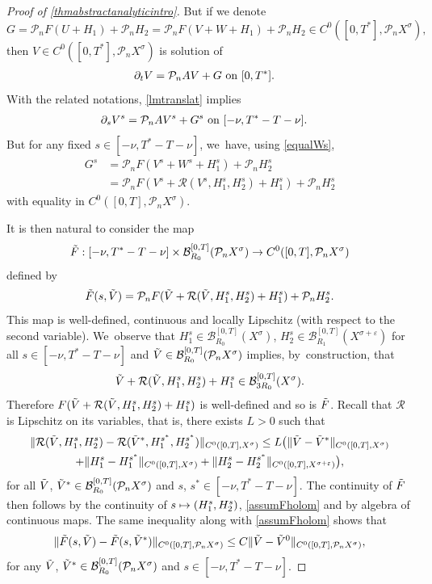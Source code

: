 \documentclass[10pt]{amsart}
\newcommand\mto{\mathchoice{\longmapsto}{\mapsto}{\mapsto}{\mapsto}}
\theoremstyle{definition}
\let\mc\mathcal
\let\veps\varepsilon
\newcommand{\B}{\mc{B}}
\renewcommand{\P}{\mathcal{P}}
\providecommand{\norm}[1]{\lVert#1\rVert}
\begin{document}
\begin{proof}[Proof of \cref{thmabstractanalyticintro}]
But if we denote
\[
G=\P_n F(U+H_{1})+\P_n H_{2}=\P_n F(V+W+H_{1})+\P_n H_{2}\in C^0([0,T^*],\P_n X^{\sigma}),
\]
then $V\in C^0([0,T^*],\P_n X^{\sigma})$ is solution of
\begin{align*}
\partial_t V=\P_n AV+G& \textnormal{ on } [0,T^{*}].
\end{align*}
With the related notations, \cref{lmtranslat} implies
\begin{align}
\label{eqVG}
\partial_s V^s=\P_n AV^s+G^s& \textnormal{ on } [-\nu, T^*-T-\nu].
\end{align}
But for any fixed $s\in [-\nu, T^*-T-\nu]$, we~have, using \eqref{equalWs},
\begin{align*}
G^s&=\P_n F(V^s+W^s+H_{1}^s)+\P_n H_{2}^s\\ &=\P_n F(V^s+\mathcal{R}(V^s,H_{1}^s,H_{2}^s)+H_{1}^s)+\P_n H_{2}^s
\end{align*}
with equality in $C^0([0,T], \P_n X^{\sigma})$.

It is then natural to consider the map
\begin{align*}
\Tilde{F}: [-\nu, T^*-T-\nu]\times \B_{R_{0}}^{[0,T]}(\P_n X^{\sigma})\to C^0([0, T], \P_n X^\sigma)
\end{align*}
defined by
\begin{align*}
\Tilde{F}(s,\Tilde{V})=\P_n F(\Tilde{V}+\mathcal{R}(\Tilde{V},H_{1}^s,H_{2}^s)+H_{1}^s)+\P_n H_{2}^s.
\end{align*}
This map is well-defined, continuous and locally Lipschitz (with respect to the second variable). We~observe that $H_1^s\in \B_{R_0}^{[0, T]}(X^\sigma)$, $H_2^s\in \B_{R_{1}}^{[0, T]}(X^{\sigma+\veps})$ for all \hbox{$s\in [-\nu, T^*-T-\nu]$} and $\Tilde{V}\in \B_{R_{0}}^{[0,T]}(\P_n X^{\sigma})$ implies, by~construction, that
\[
\Tilde{V}+\mathcal{R}(\Tilde{V},H_{1}^s,H_{2}^s)+H_{1}^s\in \B_{3R_0}^{[0, T]}(X^\sigma).
\]
Therefore $F(\Tilde{V}+\mathcal{R}(\Tilde{V},H_{1}^s,H_{2}^s)+H_{1}^s)$ is well-defined and so is $\Tilde{F}$. Recall that $\mc{R}$ is Lipschitz on its variables, that is, there exists $L>0$ such that
\begin{multline*}
\norm{\mc{R}(\Tilde{V}, H_{1}^{s}, H_2^{s})-\mc{R}(\Tilde{V}^*, H_{1}^{s^*}, H_2^{s^*})}_{C^0([0, T], X^\sigma)}\leq L\big( \norm{\Tilde{V}-\Tilde{V}^*}_{C^0([0, T], X^\sigma)}\\+\norm{H_1^{s}-H_1^{s^*}}_{C^0([0, T], X^\sigma)}+\norm{H_2^{s}-H_2^{s^*}}_{C^0([0, T], X^{\sigma+\veps})} \big),
\end{multline*}
for all $\Tilde{V}$, $\Tilde{V}^*\in \B_{R_{0}}^{[0,T]}(\P_n X^{\sigma})$ and $s$, $s^*\in [-\nu, T^*-T-\nu]$. The continuity of $\Tilde{F}$ then follows by the continuity of $s\mto (H_1^s, H_2^s)$, \cref{assumFholom} and by algebra of continuous maps. The same inequality along with \cref{assumFholom} shows that
\begin{align*}
\norm{\Tilde{F}(s, \Tilde{V})-\Tilde{F}(s, \Tilde{V}^*)}_{C^0([0, T], \P_n X^\sigma)}\leq C\norm{\Tilde{V}-\Tilde{V}^0}_{C^0([0, T], \P_n X^\sigma)},
\end{align*}
for any $\Tilde{V}$, $\Tilde{V}^*\in \B_{R_{0}}^{[0,T]}(\P_n X^{\sigma})$ and $s\in [-\nu, T^*-T-\nu]$.


\end{proof}
\end{document}
